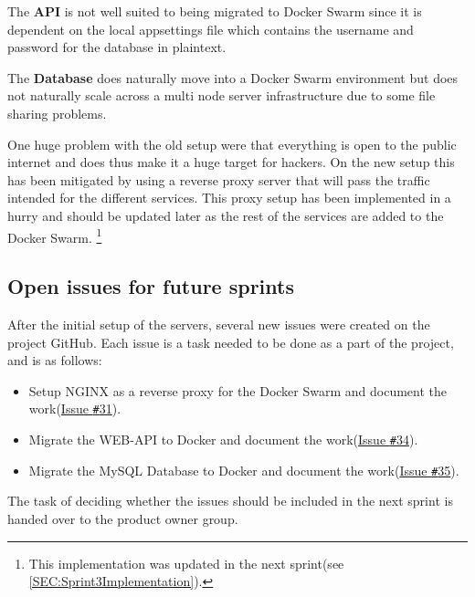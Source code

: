The \textbf{API} is not well suited to being migrated to Docker Swarm since it is dependent on the local appsettings file which contains the username and password for the database in plaintext.

The \textbf{Database} does naturally move into a Docker Swarm environment but does not naturally scale across a multi node server infrastructure due to some file sharing problems.

One huge problem with the old setup were that everything is open to the public internet and does thus make it a huge target for hackers.
On the new setup this has been mitigated by using a reverse proxy server that will pass the traffic intended for the different services.
This proxy setup has been implemented in a hurry and should be updated later as the rest of the services are added to the Docker Swarm. \footnote{This implementation was updated in the next sprint(see \autoref{SEC:Sprint3Implementation}).}

\subsection{Open issues for future sprints}
After the initial setup of the servers, several new issues were created on the project GitHub.
Each issue is a task needed to be done as a part of the project, and is as follows:

\begin{itemize}
\item Setup NGINX as a reverse proxy for the Docker Swarm and document the work(\href{https://github.com/aau-giraf/wiki/issues/31}{Issue \texttt{\#}31}).
\item Migrate the WEB-API to Docker and document the work(\href{https://github.com/aau-giraf/wiki/issues/34}{Issue \texttt{\#}34}).
\item Migrate the MySQL Database to Docker and document the work(\href{https://github.com/aau-giraf/wiki/issues/35}{Issue \texttt{\#}35}).
\end{itemize}

The task of deciding whether the issues should be included in the next sprint is handed over to the product owner group.
